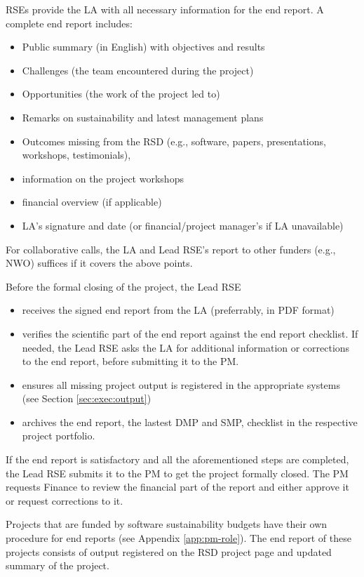 RSEs provide the LA with all necessary information for the end report.%
A complete end report includes:
\begin{itemize}
\item Public summary (in English) with objectives and results
\item Challenges (the team encountered during the project)
\item Opportunities (the work of the project led to)
\item Remarks on sustainability and latest management plans
\item Outcomes missing from the RSD (e.g., software, papers, presentations, workshops, testimonials),
\item information on the project workshops
\item financial overview (if applicable)
\item LA's signature and date (or financial/project manager's if LA unavailable)
\end{itemize}
For collaborative calls, the LA and Lead RSE's report to other funders (e.g., NWO) suffices if it covers the above points.

Before the formal closing of the project, the Lead RSE 
\begin{itemize}
   \item receives the signed end report from the LA (preferrably, in PDF format)
   \item verifies the scientific part of the end report against the end report checklist. If needed, the Lead RSE asks the LA for additional information or corrections to the end report, before submitting it to the PM. 
   \item ensures all missing project output is registered in the appropriate systems (see Section \ref{sec:exec:output}) 
   \item archives the end report, the lastest DMP and SMP, checklist in the respective project portfolio.
\end{itemize}
If the end report is satisfactory and all the aforementioned steps are completed, the Lead RSE submits it to the PM to get the project formally closed. The PM requests Finance to review the financial 
part of the report and either approve it or request corrections to it. 

Projects that are funded by software sustainability budgets have their own procedure for end reports (see Appendix
\ref{app:pm-role}). The end report of these projects consists of output registered on the RSD project page and
updated summary of the project.

